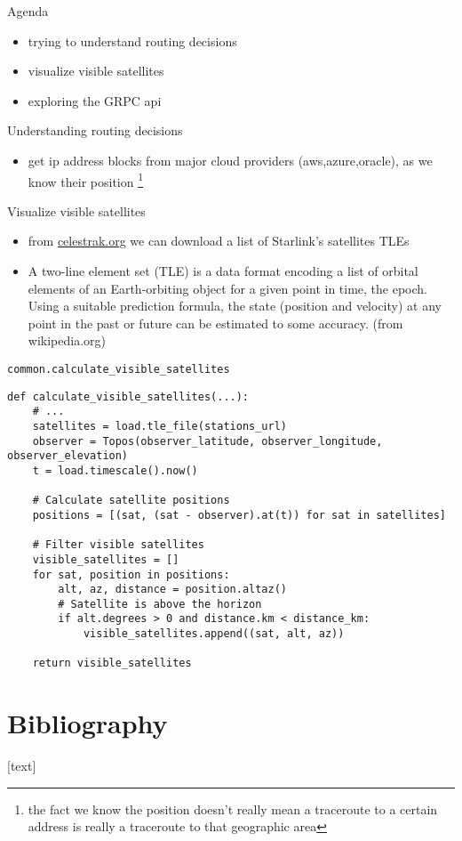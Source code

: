 \documentclass[NET,english,beameralt]{tumbeamer}
\begin{document}
\begin{frame}{Agenda}
    \begin{itemize}
        \item trying to understand routing decisions
        \item visualize visible satellites
        \item exploring the GRPC api
    \end{itemize}
\end{frame}

\begin{frame}{Understanding routing decisions}
    \begin{itemize}
        \item get ip address blocks from major cloud providers (aws,azure,oracle), as we know their position \footnote[]{the fact we know the position doesn't really mean a traceroute to a certain address is really a traceroute to that geographic area}
    \end{itemize}
\end{frame}

\begin{frame}{Visualize visible satellites}
    \begin{itemize}
        \item from \href{celestrak.org}{celestrak.org} we can download a list of Starlink's satellites TLEs
        \item A two-line element set (TLE) is a data format encoding a list of orbital elements of an Earth-orbiting object for a given point in time, the epoch. Using a suitable prediction formula, the state (position and velocity) at any point in the past or future can be estimated to some accuracy. (from wikipedia.org)
    \end{itemize}
\end{frame}

\begin{frame}[fragile]{\texttt{common.calculate\_visible\_satellites}}
    \begin{verbatim}
def calculate_visible_satellites(...):
    # ...
    satellites = load.tle_file(stations_url)
    observer = Topos(observer_latitude, observer_longitude, observer_elevation)
    t = load.timescale().now()

    # Calculate satellite positions
    positions = [(sat, (sat - observer).at(t)) for sat in satellites]
    
    # Filter visible satellites
    visible_satellites = []
    for sat, position in positions:
        alt, az, distance = position.altaz()
        # Satellite is above the horizon
        if alt.degrees > 0 and distance.km < distance_km:
            visible_satellites.append((sat, alt, az))

    return visible_satellites
    \end{verbatim}
    \end{frame}

\section{Bibliography}
\begin{frame}[allowframebreaks]
    
    [text]
    \footnotesize
    
\end{frame}
\end{document}
